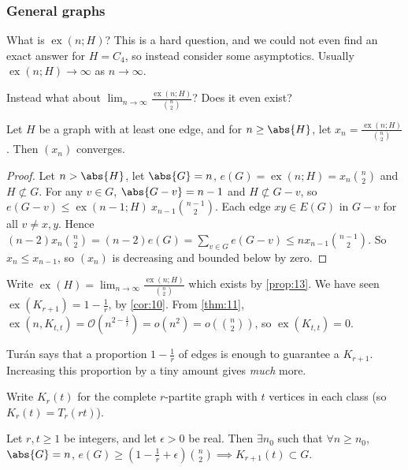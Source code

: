 \documentclass{article}
\DeclareMathOperator{\ext}{ex}
\begin{document}
\subsubsection{General graphs}

What is $\ext(n; H)$? This is a hard question, and we could not even find an exact answer for $H = C_4$, so instead consider some asymptotics.
Usually $\ext(n; H) \to \infty$ as $n \to \infty$.

Instead what about $\lim_{n \to \infty} \frac{\ext(n; H)}{\binom{n}{2}}$? Does it even exist?

\begin{nprop}\label{prop:13}
    Let $H$ be a graph with at least one edge, and for $n \geq \abs{H}$, let $x_n = \frac{\ext(n; H)}{\binom{n}{2}}$. Then $(x_n)$ converges.
\end{nprop}

\begin{proof}
    Let $n > \abs{H}$, let $\abs{G} = n$, $e(G) = \ext(n; H) = x_n \binom{n}{2}$ and $H \not\subset G$.
    For any $v \in G$, $\abs{G - v} = n-1$ and $H \not\subset G - v$, so $e(G-v) \leq \ext(n-1; H) \ x_{n-1} \binom{n-1}{2}$.
    Each edge $xy \in E(G)$ in $G-v$ for all $v \neq x, y$.
    Hence $(n-2) x_n \binom{n}{2} = (n-2) e(G) = \sum_{v \in G} e(G-v) \leq n x_{n-1} \binom{n-1}{2}$.
    So $x_n \leq x_{n-1}$, so $(x_n)$ is decreasing and bounded below by zero.
\end{proof}


Write $\ext(H) = \lim_{n \to \infty} \frac{\ext(n; H)}{\binom{n}{2}}$ which exists by \cref{prop:13}.
We have seen $\ext(K_{r+1}) = 1 - \frac{1}{r}$, by \cref{cor:10}.
From \cref{thm:11}, $\ext(n, K_{t, t}) = \mathcal{O}(n^{2 - \frac{1}{t}}) = o(n^2) = o(\binom{n}{2})$, so $\ext(K_{t, t}) = 0$.

\begin{fact}
    Tur\'an says that a proportion $1 - \frac{1}{r}$ of edges is enough to guarantee a $K_{r+1}$.
    Increasing this proportion by a tiny amount gives \emph{much} more.
\end{fact}

\begin{defi}
    Write $K_r(t)$ for the complete $r$-partite graph with $t$ vertices in each class (so $K_r(t) = T_r(rt)$).
\end{defi}

\begin{nthm}\label{thm:14}
    Let $r, t \geq 1$ be integers, and let $\epsilon > 0$ be real.
    Then $\exists n_0$ such that $\forall n \geq n_0$, $\abs{G} = n$, $e(G) \geq (1 - \frac{1}{r} + \epsilon) \binom{n}{2} \implies K_{r+1}(t) \subset G$.
\end{nthm}
\end{document}
